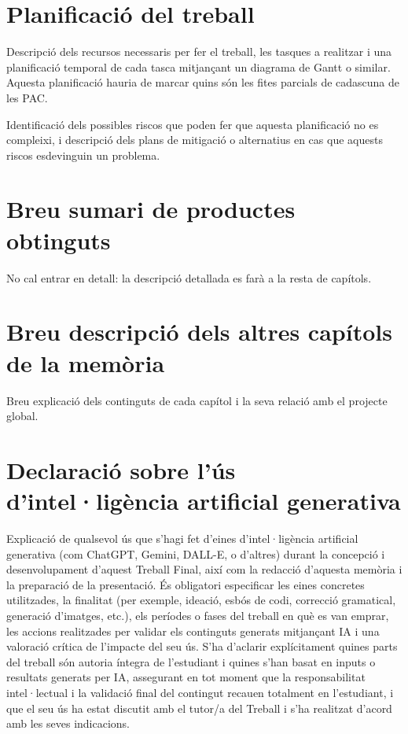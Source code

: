\documentclass[CAT]{TFUOC}%
\begin{document}
\section{Planificació del treball}

Descripció dels recursos necessaris per fer el treball, les tasques a realitzar i una planificació temporal de cada tasca mitjançant un diagrama de Gantt o similar. Aquesta planificació hauria de marcar quins són les fites parcials de cadascuna de les PAC.

Identificació dels possibles riscos que poden fer que aquesta planificació no es compleixi, i descripció dels plans de mitigació o alternatius en cas que aquests riscos esdevinguin un problema.

\section{Breu sumari de productes obtinguts}

No cal entrar en detall: la descripció detallada es farà a la resta de capítols.


\section{Breu descripció dels altres capítols de la memòria}

Breu explicació dels continguts de cada capítol i la seva relació amb el projecte global.

\section{Declaració sobre l’ús d’intel·ligència artificial generativa}

Explicació de qualsevol ús que s'hagi fet d'eines d'intel·ligència artificial generativa (com ChatGPT, Gemini, DALL-E, o d'altres) durant la concepció i desenvolupament d'aquest Treball Final, així com la redacció d'aquesta memòria i la preparació de la presentació. És obligatori especificar les eines concretes utilitzades, la finalitat (per exemple, ideació, esbós de codi, correcció gramatical, generació d'imatges, etc.), els períodes o fases del treball en què es van emprar, les accions realitzades per validar els continguts generats mitjançant IA i una valoració crítica de l'impacte del seu ús. S'ha d'aclarir explícitament quines parts del treball són autoria íntegra de l'estudiant i quines s'han basat en inputs o resultats generats per IA, assegurant en tot moment que la responsabilitat intel·lectual i la validació final del contingut recauen totalment en l'estudiant, i que el seu ús ha estat discutit amb el tutor/a del Treball i s'ha realitzat d'acord amb les seves indicacions.
\end{document}
